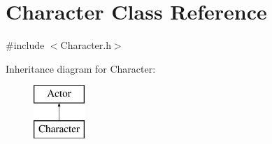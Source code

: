 \hypertarget{class_character}{}\section{Character Class Reference}
\label{class_character}


{\ttfamily \#include $<$Character.\+h$>$}

Inheritance diagram for Character\+:\begin{figure}[H]
\begin{center}
\leavevmode
\includegraphics[height=2.000000cm]{class_character}
\end{center}
\end{figure}
